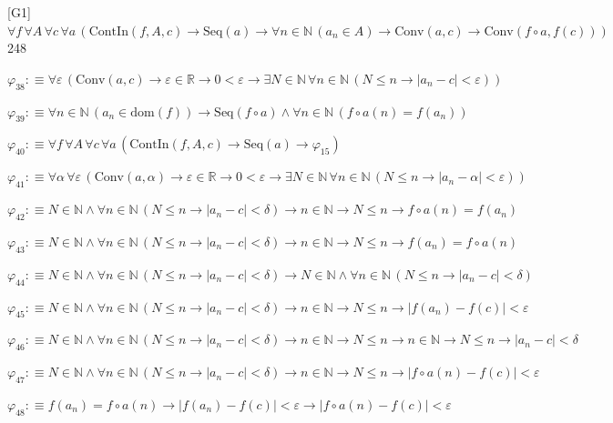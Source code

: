 \begin{fullproof}{[G1]}{$\forall f\,\forall A\,\forall c\,\forall a\,(\mathrm{ContIn}(f,A,c) \to \mathrm{Seq}(a) \to \forall n \in \mathbb{N}\,(a_{n} \in A) \to \mathrm{Conv}(a,c) \to \mathrm{Conv}(f \circ a,f(c)))$}{248}
\begin{abbrevlist}
\item $\varphi_{38} :\equiv \forall \varepsilon\,(\mathrm{Conv}(a,c) \to \varepsilon \in \mathbb{R} \to 0 < \varepsilon \to \exists N \in \mathbb{N}\,\forall n \in \mathbb{N}\,(N \leq n \to \lvert a_{n} - c \rvert < \varepsilon))$
\item $\varphi_{39} :\equiv \forall n \in \mathbb{N}\,(a_{n} \in \mathrm{dom}(f)) \to \mathrm{Seq}(f \circ a) \land \forall n \in \mathbb{N}\,(f \circ a(n) = f(a_{n}))$
\item $\varphi_{40} :\equiv \forall f\,\forall A\,\forall c\,\forall a\,(\mathrm{ContIn}(f,A,c) \to \mathrm{Seq}(a) \to \varphi_{15})$
\item $\varphi_{41} :\equiv \forall \alpha\,\forall \varepsilon\,(\mathrm{Conv}(a,\alpha) \to \varepsilon \in \mathbb{R} \to 0 < \varepsilon \to \exists N \in \mathbb{N}\,\forall n \in \mathbb{N}\,(N \leq n \to \lvert a_{n} - \alpha \rvert < \varepsilon))$
\item $\varphi_{42} :\equiv N \in \mathbb{N} \land \forall n \in \mathbb{N}\,(N \leq n \to \lvert a_{n} - c \rvert < \delta) \to n \in \mathbb{N} \to N \leq n \to f \circ a(n) = f(a_{n})$
\item $\varphi_{43} :\equiv N \in \mathbb{N} \land \forall n \in \mathbb{N}\,(N \leq n \to \lvert a_{n} - c \rvert < \delta) \to n \in \mathbb{N} \to N \leq n \to f(a_{n}) = f \circ a(n)$
\item $\varphi_{44} :\equiv N \in \mathbb{N} \land \forall n \in \mathbb{N}\,(N \leq n \to \lvert a_{n} - c \rvert < \delta) \to N \in \mathbb{N} \land \forall n \in \mathbb{N}\,(N \leq n \to \lvert a_{n} - c \rvert < \delta)$
\item $\varphi_{45} :\equiv N \in \mathbb{N} \land \forall n \in \mathbb{N}\,(N \leq n \to \lvert a_{n} - c \rvert < \delta) \to n \in \mathbb{N} \to N \leq n \to \lvert f(a_{n}) - f(c) \rvert < \varepsilon$
\item $\varphi_{46} :\equiv N \in \mathbb{N} \land \forall n \in \mathbb{N}\,(N \leq n \to \lvert a_{n} - c \rvert < \delta) \to n \in \mathbb{N} \to N \leq n \to n \in \mathbb{N} \to N \leq n \to \lvert a_{n} - c \rvert < \delta$
\item $\varphi_{47} :\equiv N \in \mathbb{N} \land \forall n \in \mathbb{N}\,(N \leq n \to \lvert a_{n} - c \rvert < \delta) \to n \in \mathbb{N} \to N \leq n \to \lvert f \circ a(n) - f(c) \rvert < \varepsilon$
\item $\varphi_{48} :\equiv f(a_{n}) = f \circ a(n) \to \lvert f(a_{n}) - f(c) \rvert < \varepsilon \to \lvert f \circ a(n) - f(c) \rvert < \varepsilon$

\end{abbrevlist}
\end{fullproof}

